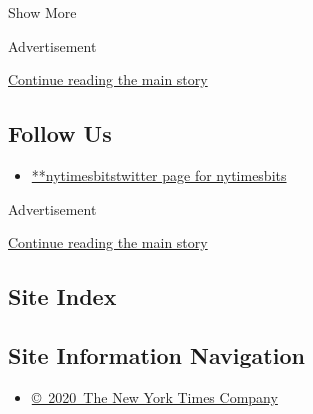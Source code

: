 Show More

Advertisement

\protect\hyperlink{after-mid3}{Continue reading the main story}

\hypertarget{follow-us}{%
\subsection{Follow Us}\label{follow-us}}

\begin{itemize}
\tightlist
\item
  \href{https://twitter.com/nytimesbits}{**nytimesbitstwitter page for
  nytimesbits}
\end{itemize}

Advertisement

\protect\hyperlink{after-mktg}{Continue reading the main story}

\hypertarget{site-index}{%
\subsection{Site Index}\label{site-index}}

\hypertarget{site-information-navigation}{%
\subsection{Site Information
Navigation}\label{site-information-navigation}}

\begin{itemize}
\tightlist
\item
  \href{https://help.nytimes3xbfgragh.onion/hc/en-us/articles/115014792127-Copyright-notice}{©~2020~The
  New York Times Company}
\end{itemize}

